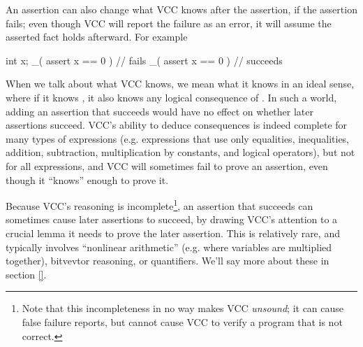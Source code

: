 

An assertion can also change what VCC knows after the assertion, if
the assertion fails; even though VCC will report the failure as an error,
it will assume the asserted fact holds afterward. For example
\begin{VCC}
int x;
_( assert x == 0 ) // fails
_( assert x == 0 ) // succeeds
\end{VCC}

When we talk about what VCC knows, we mean what it knows in an ideal
sense, where if it knows , it also knows any logical
consequence of . In such a world, adding an assertion that
succeeds would have no effect on whether later assertions succeed.
VCC's ability to deduce consequences is indeed complete for many types
of expressions (e.g. expressions that use only equalities,
inequalities, addition, subtraction, multiplication by constants, and
logical operators), but not for all expressions, and VCC will
sometimes fail to prove an assertion, even though it ``knows'' enough
to prove it.  

Because VCC's reasoning is incomplete\footnote{Note that this
  incompleteness in no way makes VCC \emph{unsound}; it can cause
  false failure reports, but cannot cause VCC to verify a program that
  is not correct.}, an assertion that succeeds can sometimes cause
later assertions to succeed, by drawing VCC's attention to a crucial
lemma it needs to prove the later assertion.  This is relatively rare,
and typically involves ``nonlinear arithmetic'' (e.g. where variables
are multiplied together), bitvevtor reasoning, or quantifiers. We'll
say more about these in section \ref{}.

